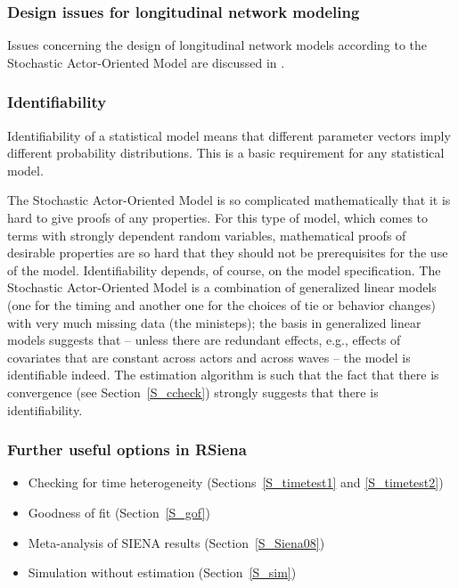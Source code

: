 \documentclass[a4paper,fleqn,11pt]{article}
\newcommand{\+}{\, + \,}
\newcommand{\RS}{{\sf RSiena }}
\newcommand{\SI}{{\sf SIENA }}
\newcommand{\SAOM}{{Stochastic Actor-Oriented Model }}
\begin{document}
\subsubsection{Design issues for longitudinal network modeling}

Issues concerning the design of longitudinal network models
according to the \SAOM are discussed in
\citet{StadfeldSnijdersSteglichVanDuijn2018}.

\subsubsection{Identifiability}

Identifiability of a statistical model means that different
parameter vectors imply different probability distributions.
This is a basic requirement for any statistical model.

The \SAOM is so complicated mathematically that it is hard to give
proofs of any properties.
For this type of model, which comes to terms with strongly dependent
random variables, mathematical proofs of desirable properties
are so hard that they should not be prerequisites for the use of the model.
Identifiability depends, of course, on the model specification.
The \SAOM is a combination of generalized linear models
(one for the timing and another one for the choices of tie or behavior changes)
with very much missing data (the ministeps);
the basis in generalized linear models suggests
that -- unless there are redundant effects, e.g.,
effects of covariates that are constant across actors and across
waves -- the model is identifiable indeed.
The estimation algorithm is such that the fact that there is convergence
(see Section~\ref{S_ccheck}) strongly suggests that there is identifiability.


\subsubsection{Further useful options in \RS}
\label{S_etc}
\begin{itemize}
	\item	Checking for time heterogeneity (Sections~\ref{S_timetest1}
            and \ref{S_timetest2})
	\item	Goodness of fit (Section~\ref{S_gof})
	\item	Meta-analysis of \SI results (Section~\ref{S_Siena08})
	\item	Simulation without estimation (Section~\ref{S_sim})
\end{itemize}
\end{document}

